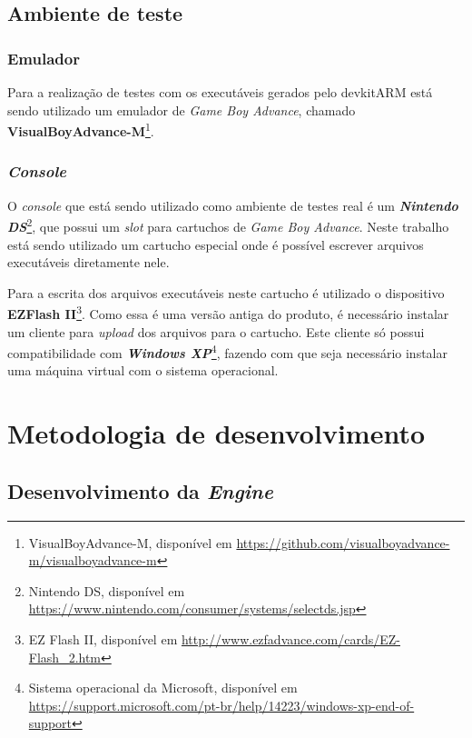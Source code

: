   \subsection{Ambiente de teste}

    \subsubsection{Emulador}

      Para a realização de testes com os executáveis gerados pelo devkitARM está sendo utilizado um emulador de \textit{Game Boy Advance}, chamado \textbf{VisualBoyAdvance-M}\footnote{VisualBoyAdvance-M, disponível em \url{https://github.com/visualboyadvance-m/visualboyadvance-m}}.

    \subsubsection{\textit{Console}}

      O \textit {console} que está sendo utilizado como ambiente de testes real é um \textbf{\textit{Nintendo DS}}\footnote{Nintendo DS, disponível em \url{https://www.nintendo.com/consumer/systems/selectds.jsp}}, que possui um \textit{slot} para cartuchos de \textit{Game Boy Advance}. Neste trabalho está sendo utilizado um cartucho especial onde é possível escrever arquivos executáveis diretamente nele.

      Para a escrita dos arquivos executáveis neste cartucho é utilizado o dispositivo \textbf{EZFlash II}\footnote{EZ Flash II, disponível em \url{http://www.ezfadvance.com/cards/EZ-Flash_2.htm}}. Como essa é uma versão antiga do produto, é necessário instalar um cliente para \textit{upload} dos arquivos para o cartucho. Este cliente só possui compatibilidade com \textit{\textbf{Windows XP}}\footnote{Sistema operacional da Microsoft, disponível em \url{https://support.microsoft.com/pt-br/help/14223/windows-xp-end-of-support}}, fazendo com que seja necessário instalar uma máquina virtual com o sistema operacional.

\section{Metodologia de desenvolvimento}

  \subsection{Desenvolvimento da \textit{Engine}}


